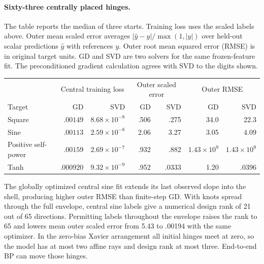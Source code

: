 \paragraph{Sixty-three centrally placed hinges.}
The table reports the median of three starts. Training loss uses the scaled labels above. Outer mean scaled error averages \( |\hat y-y|/\max(1,|y|) \) over held-out scalar predictions \(\hat y\) with references \(y\). Outer root mean squared error (RMSE) is in original target units. GD and SVD are two solvers for the same frozen-feature fit. The preconditioned gradient calculation agrees with SVD to the digits shown.
\begin{center}
\begin{minipage}{\linewidth}
\centering
\makeatletter{}\makeatother
\caption{Central loss, mean scaled outer error and unscaled outer RMSE on frozen features. Each result is the median of three starts for 63 central hinges. GD uses 5,000 spectral steps and SVD uses the numerical least-squares solution.}\label{tab:convex_rmse}
\small\setlength{\tabcolsep}{4pt}
\begin{tabular}{@{}lrrrrrr@{}}\toprule
& \multicolumn{2}{c}{Central training loss} & \multicolumn{2}{c}{Outer scaled error} & \multicolumn{2}{c}{Outer RMSE}\\
Target & GD & SVD & GD & SVD & GD & SVD\\\midrule
Square & $.00149$ & $8.68\times 10^{-8}$ & .506 & .275 & 34.0 & 22.3\\
Sine & $.00113$ & $2.59\times 10^{-8}$ & 2.06 & 3.27 & 3.05 & 4.09\\
Positive self-power & $.00159$ & $2.69\times 10^{-7}$ & .932 & .882 & $1.43\times 10^9$ & $1.43\times 10^9$\\
Tanh & $.000920$ & $9.32\times 10^{-9}$ & .952 & .0333 & 1.20 & .0396\\\bottomrule
\end{tabular}
\end{minipage}
\end{center}
The globally optimized central sine fit extends its last observed slope into the shell, producing higher outer RMSE than finite-step GD. With knots spread through the full envelope, central sine labels give a numerical design rank of 21 out of 65 directions. Permitting labels throughout the envelope raises the rank to 65 and lowers mean outer scaled error from 5.43 to .00194 with the same optimizer. In the zero-bias Xavier arrangement all initial hinges meet at zero, so the model has at most two affine rays and design rank at most three. End-to-end BP can move those hinges.
